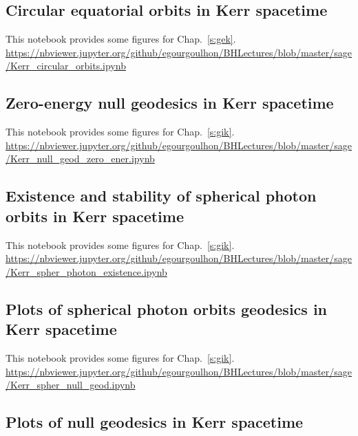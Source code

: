 \subsection{Circular equatorial orbits in Kerr spacetime} \label{s:sam:Kerr_circular_orbits}

This notebook provides some figures for Chap.~\ref{s:gek}.\\[1ex]
{\footnotesize
\url{https://nbviewer.jupyter.org/github/egourgoulhon/BHLectures/blob/master/sage/Kerr_circular_orbits.ipynb}
}

\subsection{Zero-energy null geodesics in Kerr spacetime} \label{s:sam:Kerr_null_geod_zero_ener}

This notebook provides some figures for Chap.~\ref{s:gik}.\\[1ex]
{\footnotesize
\url{https://nbviewer.jupyter.org/github/egourgoulhon/BHLectures/blob/master/sage/Kerr_null_geod_zero_ener.ipynb}
}

\subsection{Existence and stability of spherical photon orbits in Kerr spacetime} \label{s:sam:Kerr_spher_photon_existence}

This notebook provides some figures for Chap.~\ref{s:gik}.\\[1ex]
{\footnotesize
\url{https://nbviewer.jupyter.org/github/egourgoulhon/BHLectures/blob/master/sage/Kerr_spher_photon_existence.ipynb}
}

\subsection{Plots of spherical photon orbits geodesics in Kerr spacetime}
\label{s:sam:Kerr_spher_null_geod}

This notebook provides some figures for Chap.~\ref{s:gik}.\\[1ex]
{\footnotesize
\url{https://nbviewer.jupyter.org/github/egourgoulhon/BHLectures/blob/master/sage/Kerr_spher_null_geod.ipynb}
}

\subsection{Plots of null geodesics in Kerr spacetime} \label{s:sam:Kerr_null_geod_plots}

